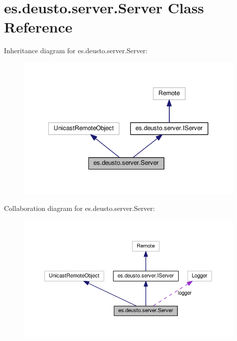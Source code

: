 \hypertarget{classes_1_1deusto_1_1server_1_1_server}{}\section{es.\+deusto.\+server.\+Server Class Reference}
\label{classes_1_1deusto_1_1server_1_1_server}


Inheritance diagram for es.\+deusto.\+server.\+Server\+:
\nopagebreak
\begin{figure}[H]
\begin{center}
\leavevmode
\includegraphics[width=336pt]{classes_1_1deusto_1_1server_1_1_server__inherit__graph}
\end{center}
\end{figure}


Collaboration diagram for es.\+deusto.\+server.\+Server\+:
\nopagebreak
\begin{figure}[H]
\begin{center}
\leavevmode
\includegraphics[width=350pt]{classes_1_1deusto_1_1server_1_1_server__coll__graph}
\end{center}
\end{figure}
